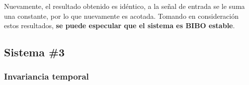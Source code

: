			Nuevamente, el resultado obtenido es idéntico, a la señal de entrada se le suma una constante, por lo que nuevamente es acotada. Tomando en consideración estos resultados, \textbf{se puede especular que el sistema es BIBO estable}.

\newpage

	\subsection{Sistema \#3}
		\subsubsection{Invariancia temporal}
			
	